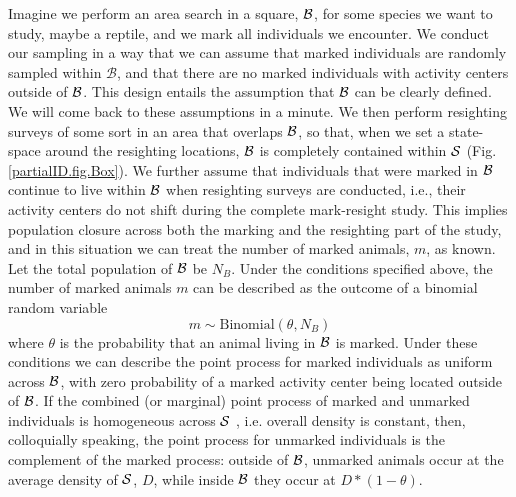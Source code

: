 Imagine we perform an area search in a square, ${\cal B}$, for some species we want to study, maybe a reptile, and we mark all individuals we encounter. We conduct our sampling in a way that we can assume that marked individuals are randomly
sampled within $\mathcal{B}$, and that there are no marked individuals with activity centers outside of ${\cal B}$.
This design entails the assumption that ${\cal B}$ can be clearly defined. We will come back to these assumptions in a minute. We then perform resighting surveys of some sort in an area that overlaps ${\cal B}$, so that, when we set a state-space around the resighting locations, ${\cal B}$ is completely contained within ${\cal S}$ (Fig. \ref{partialID.fig.Box}). We further assume that individuals that were marked in ${\cal B}$ continue to live within ${\cal B}$ when resighting surveys are conducted, i.e., their activity centers do not shift during the complete mark-resight study. This implies population closure across both the marking and the resighting part of the study, and in this situation we can treat the number of marked animals,  $m$, as known.
Let the total population of ${\cal B}$ be $N_B$. Under the conditions specified above, the number of marked animals $m$ can be described as the outcome of a binomial random variable
\[
m \sim \mbox{Binomial}(\theta, N_B)
\]
where $\theta$ is the probability that an animal living in ${\cal B}$ is marked.
Under these conditions we can describe the point process for marked individuals as uniform across ${\cal B}$, with zero probability of a marked activity center being located outside of ${\cal B}$. If the combined (or marginal) point process of marked and unmarked individuals is homogeneous across ${\cal S}$ , i.e. overall density is constant, then, colloquially speaking, the point process for unmarked individuals is the complement of the marked process: outside of ${\cal B}$, unmarked animals occur at the average density of ${\cal S}$, $D$, while inside ${\cal B}$ they occur at $D * (1-\theta)$.

